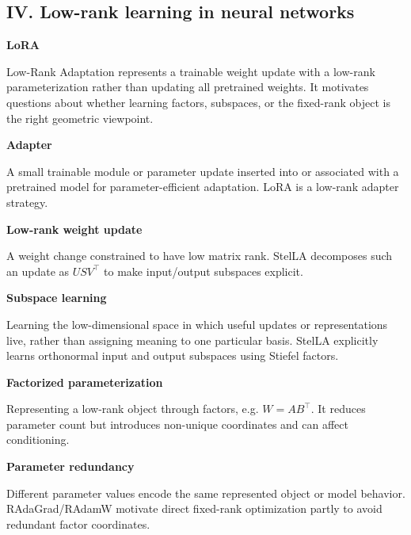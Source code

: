 \documentclass[10pt]{article}
\newenvironment{glossaryentry}[1]{%
  \par\medskip\noindent
  {\large\bfseries #1}\par\smallskip
}{\par\medskip}
\begin{document}
\subsection{IV. Low-rank learning in neural networks}

\begin{glossaryentry}{LoRA}
Low-Rank Adaptation represents a trainable weight update with a low-rank parameterization rather than updating all pretrained weights. It motivates questions about whether learning factors, subspaces, or the fixed-rank object is the right geometric viewpoint.
\par{}
\end{glossaryentry}


\begin{glossaryentry}{Adapter}
A small trainable module or parameter update inserted into or associated with a pretrained model for parameter-efficient adaptation. LoRA is a low-rank adapter strategy.
\par\smallskip{\small\color{muted}[HUE22]}
\end{glossaryentry}


\begin{glossaryentry}{Low-rank weight update}
A weight change constrained to have low matrix rank. StelLA decomposes such an update as $USV^\top$ to make input/output subspaces explicit.
\par\smallskip{\small\color{muted}[LIS25]}
\end{glossaryentry}


\begin{glossaryentry}{Subspace learning}
Learning the low-dimensional space in which useful updates or representations live, rather than assigning meaning to one particular basis. StelLA explicitly learns orthonormal input and output subspaces using Stiefel factors.
\par\smallskip{\small\color{muted}[LIS25]}
\end{glossaryentry}


\begin{glossaryentry}{Factorized parameterization}
Representing a low-rank object through factors, e.g. $W=AB^\top$. It reduces parameter count but introduces non-unique coordinates and can affect conditioning.
\par\smallskip{\small\color{muted}[BIA25]}
\end{glossaryentry}


\begin{glossaryentry}{Parameter redundancy}
Different parameter values encode the same represented object or model behavior. RAdaGrad/RAdamW motivate direct fixed-rank optimization partly to avoid redundant factor coordinates.
\par\smallskip{\small\color{muted}[BIA25]}
\end{glossaryentry}
\end{document}
